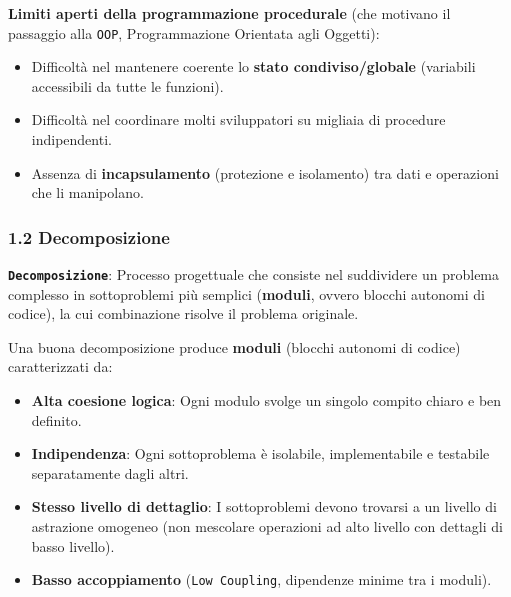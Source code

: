 \textbf{Limiti aperti della programmazione procedurale} (che motivano il passaggio alla \texttt{OOP}, Programmazione Orientata agli Oggetti):

\begin{itemize}

\item Difficoltà nel mantenere coerente lo \textbf{stato condiviso/globale} (variabili accessibili da tutte le funzioni).



\item Difficoltà nel coordinare molti sviluppatori su migliaia di procedure indipendenti.



\item Assenza di \textbf{incapsulamento} (protezione e isolamento) tra dati e operazioni che li manipolano.

\end{itemize}

\subsubsection{1.2 Decomposizione}\label{1-2-decomposizione}

\textbf{\texttt{Decomposizione}}: Processo progettuale che consiste nel suddividere un problema complesso in sottoproblemi più semplici (\textbf{moduli}, ovvero blocchi autonomi di codice), la cui combinazione risolve il problema originale.

Una buona decomposizione produce \textbf{moduli} (blocchi autonomi di codice) caratterizzati da:

\begin{itemize}

\item \textbf{Alta coesione logica}: Ogni modulo svolge un singolo compito chiaro e ben definito.



\item \textbf{Indipendenza}: Ogni sottoproblema è isolabile, implementabile e testabile separatamente dagli altri.



\item \textbf{Stesso livello di dettaglio}: I sottoproblemi devono trovarsi a un livello di astrazione omogeneo (non mescolare operazioni ad alto livello con dettagli di basso livello).



\item \textbf{Basso accoppiamento} (\texttt{Low Coupling}, dipendenze minime tra i moduli).

\end{itemize}

